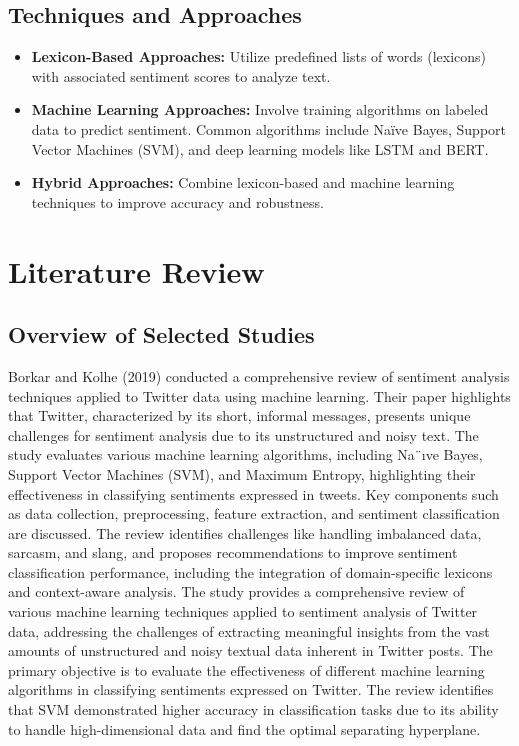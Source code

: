 \documentclass{IEEEtran}
\begin{document}
\subsection{Techniques and Approaches}
\begin{itemize}
    \item \textbf{Lexicon-Based Approaches:} Utilize predefined lists of words (lexicons) with associated sentiment scores to analyze text.
    \item \textbf{Machine Learning Approaches:} Involve training algorithms on labeled data to predict sentiment. Common algorithms include Naïve Bayes, Support Vector Machines (SVM), and deep learning models like LSTM and BERT.
    \item \textbf{Hybrid Approaches:} Combine lexicon-based and machine learning techniques to improve accuracy and robustness.
\end{itemize}

\section{Literature Review}

\subsection{Overview of Selected Studies}

Borkar and Kolhe (2019) conducted a comprehensive review of sentiment analysis techniques applied to Twitter data using machine learning. Their paper highlights that Twitter, characterized by its short, informal messages, presents unique challenges for sentiment analysis due to its unstructured and noisy text. The study evaluates various machine learning algorithms, including Na¨ıve Bayes, Support Vector Machines (SVM), and Maximum Entropy, highlighting their effectiveness in classifying sentiments expressed in tweets. Key components such as data collection, preprocessing, feature extraction, and sentiment classification are discussed. The review identifies challenges like handling imbalanced data, sarcasm, and slang, and proposes recommendations to improve sentiment classification performance, including the integration of domain-specific lexicons and context-aware analysis. The study provides a comprehensive review of various machine learning techniques applied to sentiment analysis of Twitter data, addressing the challenges of extracting meaningful insights from the vast amounts of unstructured and noisy textual data inherent in Twitter posts. The primary objective is to evaluate the effectiveness of different machine learning algorithms in classifying sentiments expressed on Twitter.  The review identifies that SVM demonstrated higher accuracy in classification tasks due to its ability to handle high-dimensional data and find the optimal separating hyperplane.
\end{document}
